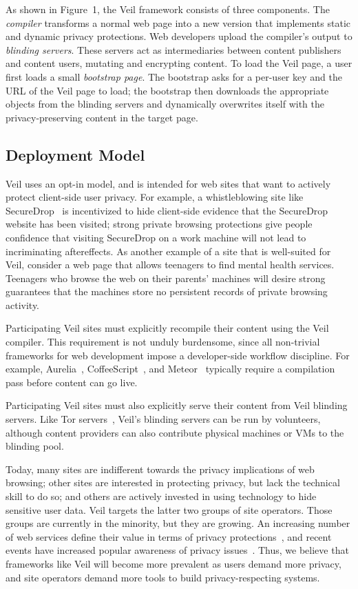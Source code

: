 As shown in Figure~1, the Veil framework  %
consists of three components. The \emph{compiler}
transforms a normal web page into a new version
that implements static and dynamic privacy protections.
Web developers upload the compiler's output to
\emph{blinding servers}. These servers act as
intermediaries between content publishers and
content users, mutating and encrypting content. To load the Veil
page, a user first loads a small \emph{bootstrap page}.
The bootstrap asks for a per-user key and the
URL of the Veil page to load; the bootstrap then
downloads the appropriate objects from the blinding
servers and dynamically overwrites itself with
the privacy-preserving content in the target page.

\subsection{Deployment Model}

Veil uses an opt-in model, and is intended
for web sites that want to actively protect
client-side user privacy. For example, a
whistleblowing site like SecureDrop~\cite{secureDrop}
is incentivized to hide client-side evidence
that the SecureDrop website has been visited;
strong private browsing protections give people
confidence that visiting SecureDrop on a work
machine will not lead to incriminating aftereffects.
As another example of a site that is well-suited
for Veil, consider a web page that allows
teenagers to find mental health services. Teenagers
who browse the web on their parents' machines 
will desire strong guarantees that the
machines store no persistent records of private
browsing activity.

Participating Veil sites must explicitly recompile
their content using the Veil compiler. This
requirement is not unduly burdensome, since
all non-trivial frameworks for web development impose
a developer-side workflow discipline. For example,
Aurelia~\cite{aurelia}, CoffeeScript~\cite{coffeeScript}, and
Meteor~\cite{meteor} typically require a
compilation pass before content can go live.

Participating Veil sites must also explicitly serve
their content from Veil blinding servers. Like
Tor servers~\cite{tor}, Veil's blinding servers
can be run by volunteers, although content providers
can also contribute physical machines or VMs to
the blinding pool.

Today, many sites are indifferent
towards the privacy implications of web browsing;
other sites are interested in protecting privacy,
but lack the technical skill to do so; and others
are actively invested in using technology to hide
sensitive user data. Veil targets the latter
two groups of site operators. Those groups are
currently in the minority, but they are growing.
An increasing number of web services define their
value in terms of privacy protections~\cite{duckduck,enigma,privio,privly},
and recent events have increased popular
awareness of privacy issues~\cite{torAfterSnowden}.
Thus, we believe that frameworks like Veil will
become more prevalent as users demand more
privacy, and site operators demand more tools to
build privacy-respecting systems.

